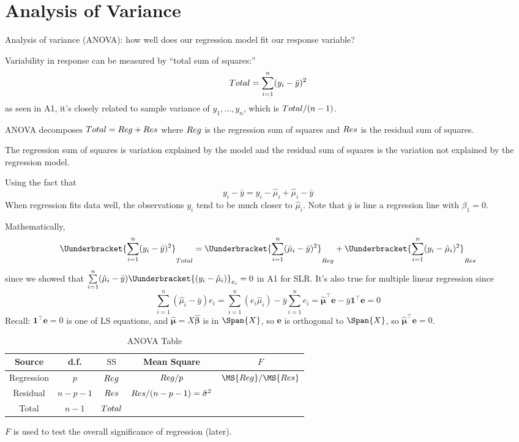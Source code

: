 \section{Analysis of Variance}
Analysis of variance (ANOVA): how well
does our regression model fit our
response variable?

Variability in response can be measured by
``total sum of squares:''
\[ \relax{Total} =
    \sum\limits_{i=1}^{n} (y_i-\bar{y})^2 \]
as seen in A1, it's closely related to
sample variance of $ y_1,\ldots,y_n $,
which is $ \relax{Total}/(n-1) $.

ANOVA decomposes $ \relax{Total}=\relax{Reg}+\relax{Res} $
where $ \relax{Reg} $ is the regression sum of squares
and $ \relax{Res} $ is the residual sum of squares.

The regression sum of squares is variation explained by
the model
and the residual sum of squares is the variation not
explained by the regression model.

Using the fact that
\[ y_i-\bar{y}=y_i-\hat{\mu}_i+\hat{\mu}_i-\bar{y} \]
When regression fits data well,
the observations $ y_i $ tend to be much closer to $ \hat{\mu}_i $.
Note that $ \bar{y} $ is line a regression line with $ \beta_1=0 $.

Mathematically,
\[ \Uunderbracket{\sum\limits_{i=1}^{n} (y_i-\bar{y})^2}_{\SS{Total}}
    =\Uunderbracket{\sum\limits_{i=1}^{n} (\hat{\mu}_i-\bar{y})^2}_{\SS{Reg}}+
    \Uunderbracket{\sum\limits_{i=1}^{n} (y_i-\hat{\mu}_i)^2}_{\SS{Res}} \]
since we showed that $ \sum\limits_{i=1}^{n}(\hat{\mu}_i-\bar{y})
    \Uunderbracket{(y_i-\hat{\mu}_i)}_{e_i}=0 $ in A1 for SLR\@.
It's also true for multiple linear regression since
\[ \sum\limits_{i=1}^{n} (\hat{\mu}_i-\bar{y})e_i=
    \sum\limits_{i=1}^{n} (e_i\hat{\mu}_i)-\bar{y}\sum\limits_{i=1}^{n} e_i
    =\hat{\symbf{\mu}}^\top\symbf{e}-\bar{y}\symbf{1}^\top\symbf{e}=0 \]
Recall: $ \symbf{1}^\top\symbf{e}=0 $ is one of LS equations,
and $ \hat{\symbf{\mu}}=X\hat{\symbf{\beta}} $ is in $ \Span{X} $,
so $ \symbf{e} $ is orthogonal to $ \Span{X} $,
so $ \hat{\symbf{\mu}}^\top\symbf{e}=0 $.

\begin{table}[ht]
    \centering
    \caption{ANOVA Table}
    \begin{NiceTabular}{|c|c|c|c|c|}
        \toprule
        Source     & d.f.      & $ \text{SS} $         & Mean Square                         & $ F $                 \\
        \midrule
        Regression & $ p $     & $ \relax{Reg} $   & $ \relax{Reg}/p $                      & $ \MS{Reg}/\MS{Res} $ \\
        Residual   & $ n-p-1 $ & $ \relax{Res} $   & $ \relax{Res}/(n-p-1)=\hat{\sigma}^2 $                         \\
        \midrule
        Total      & $ n-1 $   & $ \relax{Total} $                                                               \\
        \bottomrule
    \end{NiceTabular}
\end{table}
$ F $ is used to test the overall significance of regression (later).

